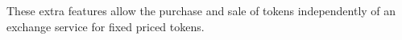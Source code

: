 These extra features allow the purchase and sale of tokens independently of an exchange service for fixed priced tokens.

